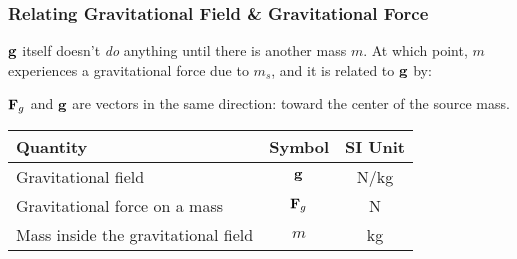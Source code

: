 \documentclass[12pt,compress,aspectratio=169]{beamer}
\newcommand{\mb}[1]{\ensuremath\mathbf{#1}}
\newcommand{\eq}[2]{\vspace{#1}{\Large\begin{displaymath}#2\end{displaymath}}}
\begin{document}
\begin{frame}
  \frametitle{Relating Gravitational Field \& Gravitational Force}

  $\mb{g}$ itself doesn't \emph{do} anything until there is another mass $m$. At
  which point, $m$ experiences a gravitational force due to $m_s$, and it is
  related to $\mb{g}$ by:

  \eq{-.2in}{
    \boxed{\mb{F}=m\mb{g}}
  }
  
  $\mb{F}_g$ and  $\mb{g}$ are vectors in the same direction: toward the
  center of the source mass.

  \begin{center}
    \begin{tabular}{l|c|c}
      \rowcolor{pink}
      \textbf{Quantity} & \textbf{Symbol} & \textbf{SI Unit} \\ \hline
      Gravitational field & $\mb{g}$   & \si{N/kg}\\
      Gravitational force on a mass & $\mb{F}_g$ & \si{N} \\
      Mass inside the gravitational field & $m$ & \si{kg} \\
    \end{tabular}
  \end{center}
\end{frame}
\end{document}
